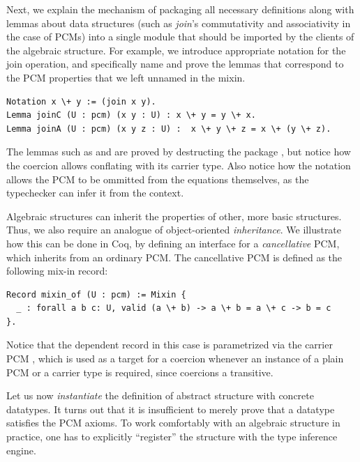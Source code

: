 Next, we explain the mechanism of packaging all necessary definitions
along with lemmas about data structures (such as \emph{join}'s
commutativity and associativity in the case of PCMs) into a single
module that should be imported by the clients of the algebraic
structure.  For example, we introduce appropriate notation for the
join operation, and specifically name and prove the lemmas that
correspond to the PCM properties that we left unnamed in the mixin.
\begin{lstlisting}
Notation x \+ y := (join x y).
Lemma joinC (U : pcm) (x y : U) : x \+ y = y \+ x.
Lemma joinA (U : pcm) (x y z : U) :  x \+ y \+ z = x \+ (y \+ z).
\end{lstlisting}
%
The lemmas such as  and  are proved by
destructing the package , but notice how the coercion allows
conflating  with its carrier type. Also notice how the
notation \code{\\+} allows the PCM  to be ommitted from
the equations themselves, as the typechecker can infer it from the
context.

Algebraic structures can inherit the properties of other, more basic
structures. Thus, we also require an analogue of object-oriented
\emph{inheritance}. We illustrate how this can be done in Coq, by
defining an interface for a \emph{cancellative} PCM, which inherits
from an ordinary PCM. The cancellative PCM is defined as the following
mix-in record:
%
\begin{lstlisting}
Record mixin_of (U : pcm) := Mixin {
  _ : forall a b c: U, valid (a \+ b) -> a \+ b = a \+ c -> b = c
}.
\end{lstlisting}
%
Notice that the dependent record  in this case is
parametrized via the carrier PCM , which is used as a target
for a coercion whenever an instance of a plain PCM or a carrier type
 is required, since coercions a transitive.

Let us now \emph{instantiate} the definition of abstract structure
with concrete datatypes. It turns out that it is insufficient to
merely prove that a datatype satisfies the PCM axioms. To work
comfortably with an algebraic structure in practice, one has to
explicitly ``register'' the structure with the type inference engine.

